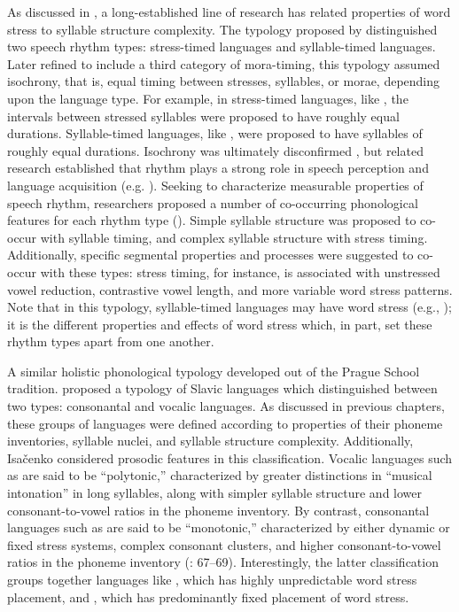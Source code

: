   As discussed in , a long-established line of research has related properties of word stress to syllable structure complexity. The typology proposed by \citet{Pike1945} distinguished two speech rhythm types: stress-timed languages and syllable-timed languages. Later refined to include a third category of mora-tim\-ing, this typology assumed isochrony, that is, equal timing between stresses, syllables, or morae, depending upon the language type. For example, in stress-timed languages, like , the intervals between stressed syllables were proposed to have roughly equal durations. Syllable-timed languages, like , were proposed to have syllables of roughly equal durations. Isochrony was ultimately disconfirmed \citep{Roach1982}, but related research established that rhythm plays a strong role in speech perception and language acquisition (e.g. \citealt{CutlerMehler1993}). Seeking to characterize measurable properties of speech rhythm, researchers proposed a number of co-occurring phonological features for each rhythm type (\citealt{Dauer1983,Auer1993}). Simple syllable structure was proposed to co-occur with syllable timing, and complex syllable structure with stress timing. Additionally, specific segmental properties and processes were suggested to co-occur with these types: stress timing, for instance, is associated with unstressed vowel reduction, contrastive vowel length, and more variable word stress patterns. Note that in this typology, syllable-timed languages may have word stress (e.g., ); it is the different properties and effects of word stress which, in part, set these rhythm types apart from one another.

  A similar holistic phonological typology developed out of the Prague School tradition. \citet{Isačenko1939/1940} proposed a typology of Slavic languages which distinguished between two types: consonantal and vocalic languages. As discussed in previous chapters, these groups of languages were defined according to properties of their phoneme inventories, syllable nuclei, and syllable structure complexity. Additionally, Isačenko considered prosodic features in this classification. Vocalic languages such as  are said to be ``polytonic,'' characterized by greater distinctions in ``musical intonation'' in long syllables, along with simpler syllable structure and lower consonant-to-vowel ratios in the phoneme inventory. By contrast, consonantal languages such as  are said to be ``monotonic,'' characterized by either dynamic or fixed stress systems, complex consonant clusters, and higher consonant-to-vowel ratios in the phoneme inventory (\citeyear{Isačenko1939/1940}: 67--69). Interestingly, the latter classification groups together languages like , which has highly unpredictable word stress placement, and , which has predominantly fixed placement of word stress.\pagebreak

